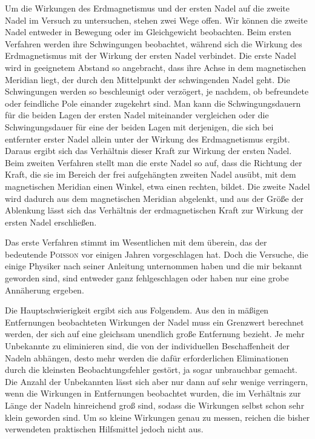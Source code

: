 Um die Wirkungen des Erdmagnetismus und der ersten Nadel auf die zweite Nadel im Versuch zu untersuchen, stehen zwei Wege offen. Wir können die zweite Nadel entweder in Bewegung oder im Gleichgewicht beobachten. Beim ersten Verfahren werden ihre Schwingungen beobachtet, während sich die Wirkung des Erdmagnetismus mit der Wirkung der ersten Nadel verbindet. Die erste Nadel wird in geeignetem Abstand so angebracht, dass ihre Achse in dem magnetischen Meridian liegt, der durch den Mittelpunkt der schwingenden Nadel geht. Die Schwingungen werden so beschleunigt oder verzögert, je nachdem, ob befreundete oder feindliche Pole einander zugekehrt sind. Man kann die Schwingungsdauern für die beiden Lagen der ersten Nadel miteinander vergleichen oder die Schwingungsdauer für eine der beiden Lagen mit derjenigen, die sich bei entfernter erster Nadel allein unter der Wirkung des Erdmagnetismus ergibt. Daraus ergibt sich das Verhältnis dieser Kraft zur Wirkung der ersten Nadel. Beim zweiten Verfahren stellt man die erste Nadel so auf, dass die Richtung der Kraft, die sie im Bereich der frei aufgehängten zweiten Nadel ausübt, mit dem magnetischen Meridian einen Winkel, etwa einen rechten, bildet. Die zweite Nadel wird dadurch aus dem magnetischen Meridian abgelenkt, und aus der Größe der Ablenkung lässt sich das Verhältnis der erdmagnetischen Kraft zur Wirkung der ersten Nadel erschließen.

Das erste Verfahren stimmt im Wesentlichen mit dem überein, das der bedeutende \textsc{Poisson} vor einigen Jahren vorgeschlagen hat. Doch die Versuche, die einige Physiker nach seiner Anleitung unternommen haben und die mir bekannt geworden sind, sind entweder ganz fehlgeschlagen oder haben nur eine grobe Annäherung ergeben.

Die Hauptschwierigkeit ergibt sich aus Folgendem. Aus den in mäßigen Entfernungen beobachteten Wirkungen der Nadel muss ein Grenzwert berechnet werden, der sich auf eine gleichsam unendlich große Entfernung bezieht. Je mehr Unbekannte zu eliminieren sind, die von der individuellen Beschaffenheit der Nadeln abhängen, desto mehr werden die dafür erforderlichen Eliminationen durch die kleinsten Beobachtungsfehler gestört, ja sogar unbrauchbar gemacht. Die Anzahl der Unbekannten lässt sich aber nur dann auf sehr wenige verringern, wenn die Wirkungen in Entfernungen beobachtet wurden, die im Verhältnis zur Länge der Nadeln hinreichend groß sind, sodass die Wirkungen selbst schon sehr klein geworden sind. Um so kleine Wirkungen genau zu messen, reichen die bisher verwendeten praktischen Hilfsmittel jedoch nicht aus.

